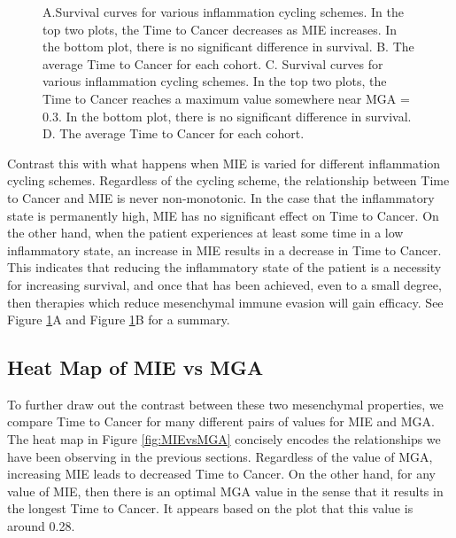 \documentclass{article}
\begin{document}
\begin{figure}[H]
\center
{}
\caption{A.Survival curves for various inflammation cycling schemes. In the top two plots, the Time to Cancer decreases as MIE increases. In the bottom plot, there is no significant difference in survival.
B. The average Time to Cancer for each cohort.
C. Survival curves for various inflammation cycling schemes. In the top two plots, the Time to Cancer reaches a maximum value somewhere near MGA = 0.3. In the bottom plot, there is no significant difference in survival.
D. The average Time to Cancer for each cohort.}
\label{fig:VaryINFL_and_MesPars}
\end{figure}

Contrast this with what happens when MIE is varied for different inflammation cycling schemes.
Regardless of the cycling scheme, the relationship between Time to Cancer and MIE is never non-monotonic.
In the case that the inflammatory state is permanently high, MIE has no significant effect on Time to Cancer.
On the other hand, when the patient experiences at least some time in a low inflammatory state, an increase in MIE results in a decrease in Time to Cancer.
This indicates that reducing the inflammatory state of the patient is a necessity for increasing survival, and once that has been achieved, even to a small degree, then therapies which reduce mesenchymal immune evasion will gain efficacy.
See Figure \ref{fig:VaryINFL_and_MesPars}A and Figure \ref{fig:VaryINFL_and_MesPars}B for a summary.

\subsection{Heat Map of MIE vs MGA}
To further draw out the contrast between these two mesenchymal properties, we compare Time to Cancer for many different pairs of values for MIE and MGA.
The heat map in Figure \ref{fig:MIEvsMGA} concisely encodes the relationships we have been observing in the previous sections.
Regardless of the value of MGA, increasing MIE leads to decreased Time to Cancer.
On the other hand, for any value of MIE, then there is an optimal MGA value in the sense that it results in the longest Time to Cancer.
It appears based on the plot that this value is around 0.28.
\end{document}
